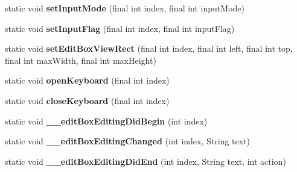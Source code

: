 \begin{DoxyCompactItemize}
static void {\bfseries set\+Input\+Mode} (final int index, final int input\+Mode)
\item 
\mbox{\label{classorg_1_1cocos2dx_1_1lib_1_1Cocos2dxEditBoxHelper_a0b319772b876facac91b90be69680bf7}} 
static void {\bfseries set\+Input\+Flag} (final int index, final int input\+Flag)
\item 
\mbox{\label{classorg_1_1cocos2dx_1_1lib_1_1Cocos2dxEditBoxHelper_a6596fd24fcafc2af40cc290050e51e1b}} 
static void {\bfseries set\+Edit\+Box\+View\+Rect} (final int index, final int left, final int top, final int max\+Width, final int max\+Height)
\item 
\mbox{\label{classorg_1_1cocos2dx_1_1lib_1_1Cocos2dxEditBoxHelper_a9c17af205eeebfd79461c7f2498f6c31}} 
static void {\bfseries open\+Keyboard} (final int index)
\item 
\mbox{\label{classorg_1_1cocos2dx_1_1lib_1_1Cocos2dxEditBoxHelper_ad98e92f3346201bfe9b35ec99d35cb7b}} 
static void {\bfseries close\+Keyboard} (final int index)
\item 
\mbox{\label{classorg_1_1cocos2dx_1_1lib_1_1Cocos2dxEditBoxHelper_a7db2b970ddef9fe0ff4f4c417e6094c6}} 
static void {\bfseries \+\_\+\+\_\+edit\+Box\+Editing\+Did\+Begin} (int index)
\item 
\mbox{\label{classorg_1_1cocos2dx_1_1lib_1_1Cocos2dxEditBoxHelper_afba63f780a4c3e7e39c62e64b1b6aaa2}} 
static void {\bfseries \+\_\+\+\_\+edit\+Box\+Editing\+Changed} (int index, String text)
\item 
\mbox{\label{classorg_1_1cocos2dx_1_1lib_1_1Cocos2dxEditBoxHelper_a950d0c0a2ced19cd769d46fa8dbe945d}} 
static void {\bfseries \+\_\+\+\_\+edit\+Box\+Editing\+Did\+End} (int index, String text, int action)
\item 
\mbox{\label{classorg_1_1cocos2dx_1_1lib_1_1Cocos2dxEditBoxHelper_ab415efbf1ea317a943d59f54a24d2d28}} 

\end{DoxyCompactItemize}
